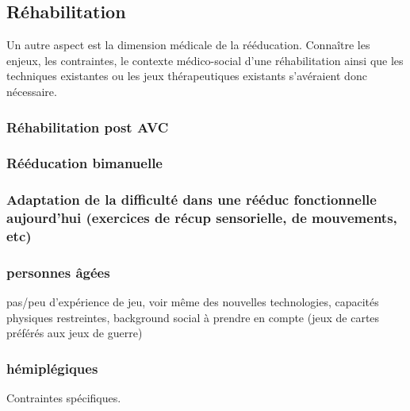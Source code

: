 	\subsection{Réhabilitation}
Un autre aspect est la dimension médicale de la rééducation. Connaître les enjeux, les contraintes, le contexte médico-social d'une réhabilitation ainsi que les techniques existantes ou les jeux thérapeutiques existants s'avéraient donc nécessaire.
	\subsubsection{Réhabilitation post AVC}
	\subsubsection{Rééducation bimanuelle}
		\subsubsection{Adaptation de la difficulté dans une rééduc fonctionnelle aujourd'hui (exercices de récup sensorielle, de mouvements, etc)}
		
		\subsubsection{personnes âgées\\}
pas/peu d'expérience de jeu, voir même des nouvelles technologies, capacités physiques restreintes, background social à prendre en compte (jeux de cartes préférés aux jeux de guerre)
		\subsubsection{hémiplégiques\\}		
Contraintes spécifiques.
